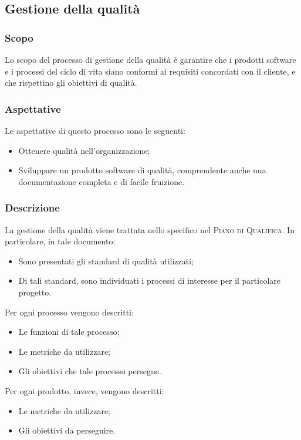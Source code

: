 \documentclass[../norme-di-progetto.tex]{subfiles}
\begin{document}
\subsection{Gestione della qualità}
\subsubsection{Scopo}
Lo scopo del processo di gestione della qualità è garantire che i prodotti software e i processi del ciclo di vita siano conformi ai requisiti concordati con il cliente, e che rispettino gli obiettivi di qualità.
\subsubsection{Aspettative}
Le aspettative di questo processo sono le seguenti:
\begin{itemize}
  \item Ottenere qualità nell'organizzazione;
  \item Sviluppare un prodotto software di qualità, comprendente anche una documentazione completa e di facile fruizione.
\end{itemize}
\subsubsection{Descrizione}
La gestione della qualità viene trattata nello specifico nel \textsc{Piano di Qualifica}. In particolare, in tale documento:
\begin{itemize}
  \item Sono presentati gli standard di qualità utilizzati;
  \item Di tali standard, sono individuati i processi di interesse per il particolare progetto.
\end{itemize}
Per ogni processo vengono descritti:
\begin{itemize}
  \item Le funzioni di tale processo;
  \item Le metriche da utilizzare;
  \item Gli obiettivi che tale processo persegue.
\end{itemize}
Per ogni prodotto, invece, vengono descritti:
\begin{itemize}
  \item Le metriche da utilizzare;
  \item Gli obiettivi da perseguire.
\end{itemize}
\end{document}
